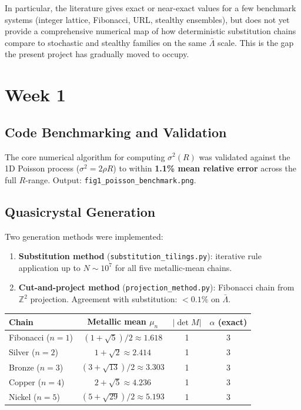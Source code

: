 \documentclass[11pt,letterpaper]{article}
\begin{document}
\noindent In particular, the literature gives exact or near-exact values for a few
benchmark systems (integer lattice, Fibonacci, URL, stealthy ensembles), but does not yet
provide a comprehensive numerical map of how deterministic substitution chains compare to
stochastic and stealthy families on the same $\bar\Lambda$ scale.
This is the gap the present project has gradually moved to occupy.

\section{Week 1}

\subsection{Code Benchmarking and Validation}

The core numerical algorithm for computing $\sigma^2(R)$ was validated against
the 1D Poisson process ($\sigma^2 = 2\rho R$) to within \textbf{1.1\% mean
relative error} across the full $R$-range.
Output: \texttt{fig1\_poisson\_benchmark.png}.

\subsection{Quasicrystal Generation}

Two generation methods were implemented:
\begin{enumerate}[noitemsep]
  \item \textbf{Substitution method} (\texttt{substitution\_tilings.py}): iterative rule
        application up to $N \sim 10^7$ for all five metallic-mean chains.
  \item \textbf{Cut-and-project method} (\texttt{projection\_method.py}): Fibonacci chain
        from $\mathbb{Z}^2$ projection. Agreement with substitution: $<0.1\%$ on $\bar\Lambda$.
\end{enumerate}

\noindent\begin{tabular}{lccc}
\toprule
\textbf{Chain} & \textbf{Metallic mean} $\mu_n$ & $|\det M|$ & $\alpha$ (exact) \\
\midrule
Fibonacci ($n=1$)   & $(1+\sqrt{5})/2 \approx 1.618$ & 1 & 3 \\
Silver    ($n=2$)   & $1+\sqrt{2} \approx 2.414$     & 1 & 3 \\
Bronze    ($n=3$)   & $(3+\sqrt{13})/2 \approx 3.303$& 1 & 3 \\
Copper    ($n=4$)   & $2+\sqrt{5} \approx 4.236$     & 1 & 3 \\
Nickel    ($n=5$)   & $(5+\sqrt{29})/2 \approx 5.193$& 1 & 3 \\
\bottomrule
\end{tabular}
\end{document}
